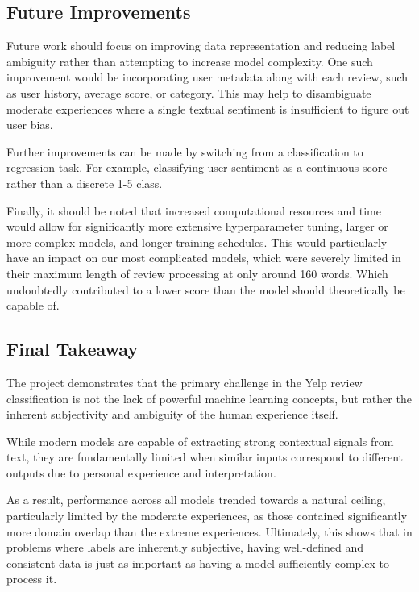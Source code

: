 \documentclass[12pt]{article}
\begin{document}
\subsection{Future Improvements}
Future work should focus on improving data representation and reducing label ambiguity rather than attempting to increase model complexity. One such improvement would be incorporating user metadata along with each review, such as user history, average score, or category. This may help to disambiguate moderate experiences where a single textual sentiment is insufficient to figure out user bias.

Further improvements can be made by switching from a classification to regression task. For example, classifying user sentiment as a continuous score rather than a discrete 1-5 class.

Finally, it should be noted that increased computational resources and time would allow for significantly more extensive hyperparameter tuning, larger or more complex models, and longer training schedules. This would particularly have an impact on our most complicated models, which were severely limited in their maximum length of review processing at only around 160 words. Which undoubtedly contributed to a lower score than the model should theoretically be capable of.

\subsection{Final Takeaway}
The project demonstrates that the primary challenge in the Yelp review classification is not the lack of powerful machine learning concepts, but rather the inherent subjectivity and ambiguity of the human experience itself.

While modern models are capable of extracting strong contextual signals from text, they are fundamentally limited when similar inputs correspond to different outputs due to personal experience and interpretation.

As a result, performance across all models trended towards a natural ceiling, particularly limited by the moderate experiences, as those contained significantly more domain overlap than the extreme experiences. Ultimately, this shows that in problems where labels are inherently subjective, having well-defined and consistent data is just as important as having a model sufficiently complex to process it.
\end{document}
